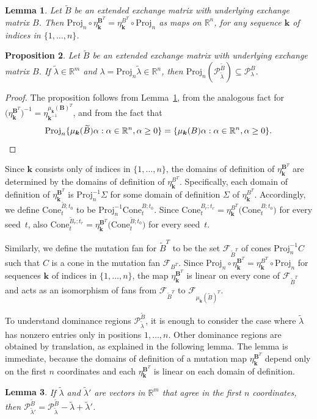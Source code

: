 \documentclass{amsart}
\newtheorem{proposition}{Proposition}[section]
\newtheorem{lemma}[proposition]{Lemma}
\theoremstyle{definition}
\theoremstyle{remark}
\numberwithin{equation}{section}
\newcommand{\reals}{\mathbb R}
\newcommand{\set}[1]{{\lbrace #1 \rbrace}}
\newcommand{\GG}{{\mathbf G}}
\newcommand{\F}{{\mathcal F}}
\newcommand{\0}{{\mathbf{0}}}
\newcommand{\Cone}{\mathrm{Cone}}
\newcommand{\Proj}{\mathrm{Proj}}
\newcommand{\kk}{{\boldsymbol{k}}}
\newcommand{\tB}{{\widetilde{B}}}
\newcommand{\BB}{\mathbf{B}}
\renewcommand{\P}{\mathcal{P}}
\begin{document}
\begin{lemma}\label{eta proj}
Let $\tB$ be an extended exchange matrix with underlying exchange matrix $B$.
Then $\Proj_n\circ\eta_\kk^{\BB^T}=\eta_\kk^{B^T}\circ\Proj_n$ as maps on $\reals^n$, for any sequence $\kk$ of indices in $\set{1,\ldots,n}$.
\end{lemma}

\begin{proposition}\label{contains proj}
Let $\tB$ be an extended exchange matrix with underlying exchange matrix $B$.
  If $\tilde\lambda\in\reals^m$ and $\lambda=\Proj_n\tilde\lambda\in\reals^n$, then $\Proj_n(\P_{\tilde\lambda}^\tB)\subseteq\P_{\lambda}^B$.
\end{proposition}
\begin{proof}
The proposition follows from Lemma~\ref{eta proj}, from the analogous fact for $\bigl(\eta_\kk^{\BB^T}\bigr)^{-1}=\eta_{\kk^{-1}}^{\mu_\kk(\BB)^T}$, and from the fact that 
\[\Proj_n\set{\mu_\kk(\tB)\alpha:\alpha\in\reals^n,\alpha\ge0}=\set{\mu_\kk(B)\alpha:\alpha\in\reals^n,\alpha\ge0}.\qedhere\]
\end{proof}

Since $\kk$ consists only of indices in $\set{1,\ldots,n}$, the domains of definition of $\eta_\kk^{\BB^T}$ are determined by the domains of definition of $\eta_\kk^{B^T}$.
Specifically, each domain of definition of $\eta_\kk^{\BB^T}$ is $\Proj_n^{-1}\Sigma$ for some domain of definition $\Sigma$ of $\eta_\kk^{B^T}$.
Accordingly, we define $\Cone_t^{\tB;t_0}$ to be %
$\Proj_n^{-1}\Cone_t^{B;t_0}$.
Since $\Cone_t^{B_r;t_r}=\eta_\kk^{B^T}\bigl(\Cone_t^{B;t_0}\bigr)$ for every seed~$t$, also $\Cone_t^{\tB_r;t_r}=\eta_\kk^{\BB^T}\bigl(\Cone_t^{\tB;t_0}\bigr)$ for every seed~$t$.

Similarly, we define the mutation fan for $\tB^T$ to be the set $\F_{\tB^T}$ of cones $\Proj_n^{-1}C$ such that $C$ is a cone in the mutation fan $\F_{B^T}$.
Since $\Proj_n\circ\eta_\kk^{\BB^T}=\eta_\kk^{B^T}\circ\Proj_n$ for sequences $\kk$ of indices in $\set{1,\ldots,n}$, the map $\eta_\kk^{\BB^T}$ is linear on every cone of $\F_{\tB^T}$ and acts as an isomorphism of fans from $\F_{\tB^T}$ to $\F_{\mu_\kk(\tB)^T}$.

To understand dominance regions $\P^\tB_{\tilde\lambda}$, it is enough to consider the case where $\tilde\lambda$ has nonzero entries only in positions $1,\ldots,n$.
Other dominance regions are obtained by translation, as explained in the following lemma.
The lemma is immediate, because the domains of definition of a mutation map $\eta_\kk^{\BB^T}$ depend only on the first $n$ coordinates and each $\eta_\kk^{\BB^T}$ is linear on each domain of definition.
\begin{lemma}\label{after all coefficients are just coefficients}
  If $\tilde\lambda$ and $\tilde\lambda'$ are vectors in $\reals^m$ that agree in the first $n$ coordinates, then $\P^\tB_{\tilde\lambda'}=\P^\tB_{\tilde\lambda}-\tilde\lambda+\tilde\lambda'$.
\end{lemma}
\end{document}
